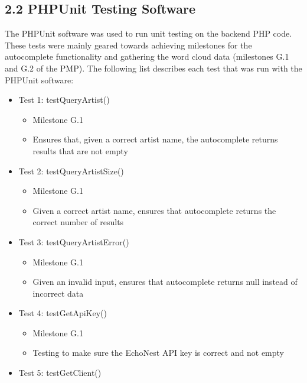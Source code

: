 \documentclass[]{article}
\begin{document}
\subsection{\textbf{2.2 PHPUnit Testing
Software}}\label{phpunit-testing-software}

The PHPUnit software was used to run unit testing on the backend PHP
code. These tests were mainly geared towards achieving milestones for
the autocomplete functionality and gathering the word cloud data
(milestones G.1 and G.2 of the PMP). The following list describes each
test that was run with the PHPUnit software:

\begin{itemize}
\itemsep1pt\parskip0pt
\item
  Test 1: testQueryArtist()

  \begin{itemize}
  \itemsep1pt\parskip0pt
  \item
    Milestone G.1
  \item
    Ensures that, given a correct artist name, the autocomplete returns
    results that are not empty
  \end{itemize}
\item
  Test 2: testQueryArtistSize()

  \begin{itemize}
  \itemsep1pt\parskip0pt
  \item
    Milestone G.1
  \item
    Given a correct artist name, ensures that autocomplete returns the
    correct number of results
  \end{itemize}
\item
  Test 3: testQueryArtistError()

  \begin{itemize}
  \itemsep1pt\parskip0pt
  \item
    Milestone G.1
  \item
    Given an invalid input, ensures that autocomplete returns null
    instead of incorrect data
  \end{itemize}
\item
  Test 4: testGetApiKey()

  \begin{itemize}
  \itemsep1pt\parskip0pt
  \item
    Milestone G.1
  \item
    Testing to make sure the EchoNest API key is correct and not empty
  \end{itemize}
\item
  Test 5: testGetClient()


\end{itemize}
\end{document}
